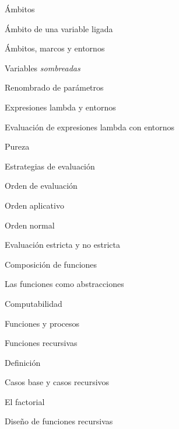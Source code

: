 \begin{longenum}
\begin{longenum}
\begin{longenum}
\begin{longenum}
                \item Ámbitos
                \begin{longenum}
                    \item Ámbito de una variable ligada
                    \item Ámbitos, marcos y entornos
                    \item Variables \textit{sombreadas}
                    \item Renombrado de parámetros
                    \item Expresiones lambda y entornos
                    \item Evaluación de expresiones lambda con entornos
                \end{longenum}
                \item Pureza
            \end{longenum}
            \item Estrategias de evaluación
            \begin{longenum}
                \item Orden de evaluación
                \begin{longenum}
                    \item Orden aplicativo
                    \item Orden normal
                \end{longenum}
                \item Evaluación estricta y no estricta
            \end{longenum}
            \item Composición de funciones
            \item Las funciones como abstracciones
        \end{longenum}
        \item Computabilidad
        \begin{longenum}
            \item Funciones y procesos
            \item Funciones recursivas
            \begin{longenum}
                \item Definición
                \item Casos base y casos recursivos
                \item El factorial
                \item Diseño de funciones recursivas
                \begin{longenum}

\end{longenum}
\end{longenum}
\end{longenum}
\end{longenum}
\end{longenum}
